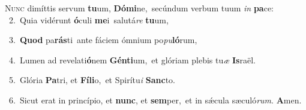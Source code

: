 \lettrine{\initial\textcolor{\initialcolor}{N}}{unc} dimíttis servum \textbf{tu}\-um, \textbf{Dó}\-\textbf{mi}ne,~\star secúndum verbum tuum \textit{in} \textbf{pa}\-ce:\\
{\numbfont\textcolor{\numbcolor}{~2.}}~Quia vidérunt \textbf{ó}\-culi \textbf{me}\-i~\star salutá\textit{re} \textbf{tu}\-um,\par
{\numbfont\textcolor{\numbcolor}{~3.}}~\textbf{Quod} pa\-\textbf{rás}\-ti~\star ante fáciem ómnium po\-\textit{pu}\-\textbf{ló}rum,\par
{\numbfont\textcolor{\numbcolor}{~4.}}~Lumen ad revelati\-\textbf{ó}\-nem \textbf{Gén}\-\textbf{ti}um,~\star et glóriam plebis tu\textit{æ} \textbf{Is}\-raël.\par
{\numbfont\textcolor{\numbcolor}{~5.}}~Glória \textbf{Pa}\-tri, et \textbf{Fí}\-\textbf{li}o,~\star et Spirítu\textit{i} \textbf{Sanc}\-to.\par
{\numbfont\textcolor{\numbcolor}{~6.}}~Sicut erat in princípio, et \textbf{nunc}\-, et \textbf{sem}\-per,~\star et in sǽcula sæculó\-\textit{rum}\-. \textbf{A}\-men.\par
